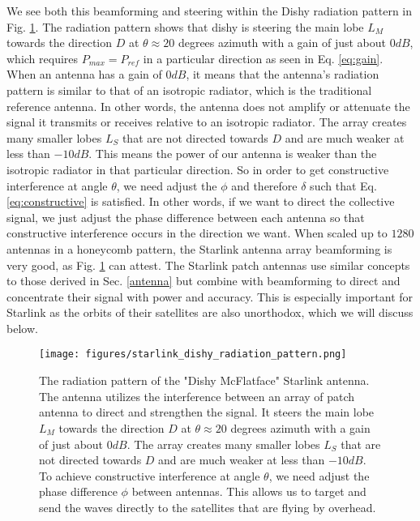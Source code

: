 \documentclass[10pt]{article}
\begin{document}
We see both this beamforming and steering within the Dishy radiation pattern in Fig. \ref{fig:dishy_radiation}. The radiation pattern shows that dishy is steering the main lobe $L_M$ towards the direction $D$ at $\theta \approx 20$ degrees azimuth with a gain of just about $0\si{dB}$, which requires $P_{max}=P_{ref}$ in a particular direction as seen in Eq. \ref{eq:gain}. When an antenna has a gain of $0\si{dB}$, it means that the antenna's radiation pattern is similar to that of an isotropic radiator, which is the traditional reference antenna. In other words, the antenna does not amplify or attenuate the signal it transmits or receives relative to an isotropic radiator. The array creates many smaller lobes $L_S$ that are not directed towards $D$ and are much weaker at less than $-10\si{dB}$. This means the power of our antenna is weaker than the isotropic radiator in that particular direction. So in order to get constructive interference at angle $\theta$, we need adjust the $\phi$ and therefore $\delta$ such that Eq. \ref{eq:constructive} is satisfied. In other words, if we want to direct the collective signal, we just adjust the phase difference between each antenna so that constructive interference occurs in the direction we want. When scaled up to $1280$ antennas in a honeycomb pattern, the Starlink antenna array beamforming is very good, as Fig. \ref{fig:dishy_radiation} can attest. The Starlink patch antennas use similar concepts to those derived in Sec. \ref{antenna} but combine with beamforming to direct and concentrate their signal with power and accuracy. This is especially important for Starlink as the orbits of their satellites are also unorthodox, which we will discuss below.

\begin{figure}[h!]
\centering
\texttt{[image: figures/starlink\_dishy\_radiation\_pattern.png]}
\caption{The radiation pattern of the "Dishy McFlatface" Starlink antenna. The antenna utilizes the interference between an array of patch antenna to direct and strengthen the signal. It steers the main lobe $L_M$ towards the direction $D$ at $\theta \approx 20$ degrees azimuth with a gain of just about $0\si{dB}$. The array creates many smaller lobes $L_S$ that are not directed towards $D$ and are much weaker at less than $-10\si{dB}$. To achieve constructive interference at angle $\theta$, we need adjust the phase difference $\phi$ between antennas. This allows us to target and send the waves directly to the satellites that are flying by overhead\cite{USPTO_report}.}
\label{fig:dishy_radiation}
\end{figure}
\end{document}
